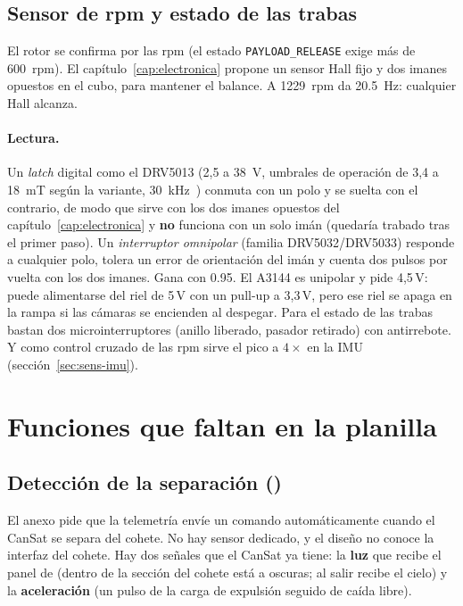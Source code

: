 \subsection{Sensor de rpm y estado de las trabas}
El rotor se confirma por las rpm (el estado \texttt{PAYLOAD\_RELEASE} exige más de
\SI{600}{rpm}). El capítulo~\ref{cap:electronica} propone un sensor Hall fijo y dos imanes
opuestos en el cubo, para mantener el balance. A \SI{1229}{rpm} da \SI{20.5}{Hz}: cualquier
Hall alcanza.

\begin{table}[H]
\centering\small
\caption{Decisión del sensor de rpm.}\label{tab:sens-hall}

\end{table}

\paragraph{Lectura.} Un \emph{latch} digital como el DRV5013 (2,5 a \SI{38}{V}, umbrales de
operación de 3,4 a \SI{18}{mT} según la variante, \SI{30}{kHz}\nv~\cite{sensores-drv5013}) conmuta
con un polo y se suelta con el contrario, de modo que sirve con los dos imanes opuestos del
capítulo~\ref{cap:electronica} y \textbf{no} funciona con un solo imán (quedaría trabado tras el primer
paso). Un \emph{interruptor omnipolar} (familia DRV5032/DRV5033\nv) responde a cualquier polo,
tolera un error de orientación del imán y cuenta dos pulsos por vuelta con los dos imanes.
Gana con \num{0.95}. El A3144 es unipolar y pide 4,5\,V: puede alimentarse del riel de 5\,V
con un pull-up a 3,3\,V, pero ese riel se apaga en la rampa si las cámaras se encienden al
despegar. Para el estado de las trabas bastan dos microinterruptores (anillo liberado, pasador
retirado) con antirrebote. Y como control cruzado de las rpm sirve el pico a $4\times$ en la IMU
(sección~\ref{sec:sens-imu}).

\section{Funciones que faltan en la planilla}\label{sec:sens-faltan}

\subsection{Detección de la separación (\texorpdfstring{}{X3})}
El anexo pide que la telemetría envíe un comando automáticamente cuando el CanSat se separa del
cohete. No hay sensor dedicado, y el diseño no conoce la interfaz del cohete. Hay dos señales
que el CanSat ya tiene: la \textbf{luz} que recibe el panel de  (dentro de la sección
del cohete está a oscuras; al salir recibe el cielo) y la \textbf{aceleración} (un pulso de la
carga de expulsión seguido de caída libre).

